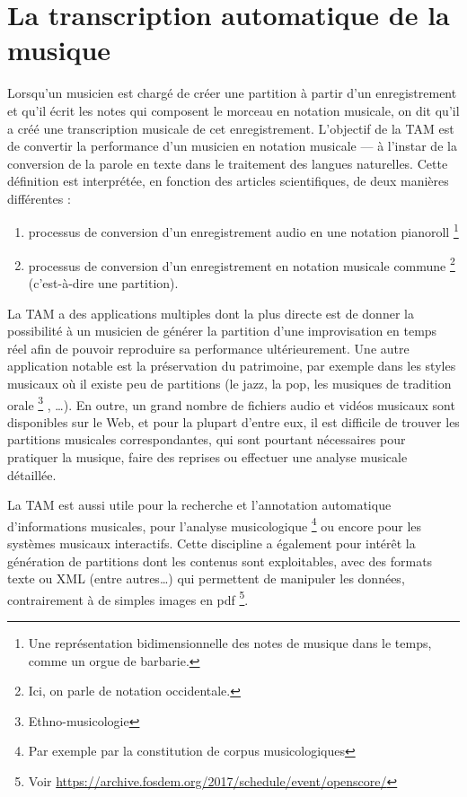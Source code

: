 \section{La transcription automatique de la musique}
Lorsqu’un musicien est chargé de créer une partition à partir d’un
enregistrement et qu’il écrit les notes qui composent le morceau en notation
musicale, on dit qu’il a créé une transcription musicale de cet enregistrement.
L’objectif de la TAM \cite{future_directions} est de convertir la performance
d’un musicien en notation musicale — à l’instar de la conversion de la parole
en texte dans le traitement des langues naturelles. Cette définition est
interprétée, en fonction des articles scientifiques, de deux manières
différentes  :
\begin{enumerate}
    \item processus de conversion d’un enregistrement audio en une notation
        pianoroll \footnote{Une représentation bidimensionnelle des notes de
            musique dans le temps, comme un orgue de barbarie.}
    \item processus de conversion d’un enregistrement en notation musicale
        commune \footnote{Ici, on parle de notation occidentale.} (c’est-à-dire
        une partition).\\
\end{enumerate}

La TAM a des applications multiples \cite{future_directions} dont la plus
directe est de donner la possibilité à un musicien de générer la partition
d’une improvisation en temps réel afin de pouvoir reproduire sa performance
ultérieurement. Une autre application notable est la préservation du
patrimoine, par exemple dans les styles musicaux où il existe peu de partitions
(le jazz, la pop, les musiques de tradition orale \footnote{Ethno-musicologie}
, …). En outre, un grand nombre de fichiers audio et vidéos musicaux sont
disponibles sur le Web, et pour la plupart d’entre eux, il est difficile de
trouver les partitions musicales correspondantes, qui sont pourtant nécessaires
pour pratiquer la musique, faire des reprises ou effectuer une analyse musicale
détaillée.

La TAM est aussi utile pour la recherche et l’annotation automatique
d’informations musicales, pour l’analyse musicologique \footnote{Par exemple
par la constitution de corpus musicologiques} ou encore pour les systèmes
musicaux interactifs. Cette discipline a également pour intérêt la génération
de partitions dont les contenus sont exploitables, avec des formats texte ou
XML (entre autres…) qui permettent de manipuler les données, contrairement à de
simples images en pdf \footnote{Voir \url{
    https://archive.fosdem.org/2017/schedule/event/openscore/}}.\\

